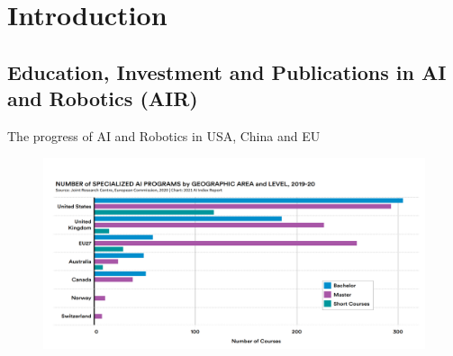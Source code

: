 \section{Introduction}

\subsection{Education, Investment and Publications in AI and Robotics (AIR)}

{

\begin{frame}{The progress of AI and Robotics in USA, China and EU}

\begin{figure}
 \centering
 \includegraphics[width=1.0\textwidth]{./figures/progress-of-air-a/outputs/drawing-v00.png}
\end{figure}

\end{frame}
}



